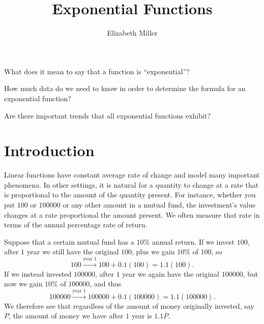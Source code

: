 \documentclass[nooutcomes]{ximera}
\author{Elizabeth Miller}
\title{Exponential Functions}
\begin{document}
\begin{abstract}
  
\end{abstract}
\maketitle



\begin{motivatingQuestions}
\item What does it mean to say that a function is ``exponential''?
\item How much data do we need to know in order to determine the formula for an exponential function?
\item Are there important trends that all exponential functions exhibit?
\end{motivatingQuestions}



\section{Introduction}
Linear functions have constant average rate of change and model many important phenomena.  In other settings, it is natural for a quantity to change at a rate that is proportional to the amount of the quantity present.  For instance, whether you put \textdollar{}\(100\) or \textdollar{}\(100000\) or any other amount in a mutual fund, the investment's value changes at a rate proportional the amount present.  We often measure that rate in terms of the annual percentage rate of return.

Suppose that a certain mutual fund has a \(10\)\% annual return.  If we invest \textdollar{}\(100\), after \(1\) year we still have the original \textdollar{}\(100\), plus we gain \(10\)\% of \textdollar{}\(100\), so%
\begin{equation*}
100 \xrightarrow{\text{year } 1} 100 + 0.1(100) = 1.1(100)\text{.}
\end{equation*}
If we instead invested \textdollar{}\(100000\), after \(1\) year we again have the original \textdollar{}\(100000\), but now we gain \(10\)\% of \textdollar{}\(100000\), and thus%
\begin{equation*}
100000 \xrightarrow{\text{year } 1} 100000 + 0.1(100000) = 1.1(100000)\text{.}
\end{equation*}
We therefore see that regardless of the amount of money originally invested, say \(P\), the amount of money we have after \(1\) year is \(1.1P\).
\end{document}
